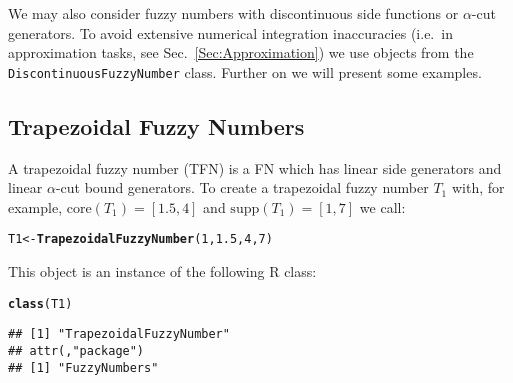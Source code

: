 \documentclass[11pt]{article}\usepackage{graphicx, color}
\makeatletter
\newcommand{\hlfunctioncall}[1]{\textcolor[rgb]{0.501960784313725,0,0.329411764705882}{\textbf{#1}}}%
\newenvironment{kframe}{%
 \def\at@end@of@kframe{}%
 \ifinner\ifhmode%
  \def\at@end@of@kframe{\end{minipage}}%
  \begin{minipage}{\columnwidth}%
 \fi\fi%
 \def\FrameCommand##1{\hskip\@totalleftmargin \hskip-\fboxsep
 \colorbox{shadecolor}{##1}\hskip-\fboxsep
     \hskip-\linewidth \hskip-\@totalleftmargin \hskip\columnwidth}%
 \MakeFramed {\advance\hsize-\width
   \@totalleftmargin\z@ \linewidth\hsize
   \@setminipage}}%
 {\par\unskip\endMakeFramed%
 \at@end@of@kframe}
\newenvironment{knitrout}{}{} %
\newcommand{\lang}[1]{\textsf{#1}\xspace}
\newcommand{\R}{\lang{R}}
\makeatother
\begin{document}
We may also consider fuzzy numbers with discontinuous side
functions or $\alpha$-cut generators.
To avoid extensive numerical integration inaccuracies 
(i.e.~in approximation tasks, see Sec.~\ref{Sec:Approximation})
we use objects from the \texttt{DiscontinuousFuzzyNumber} class.
Further on we will present some examples.


% 
% 
% 
% 
% 
% 


\subsection{Trapezoidal Fuzzy Numbers}\label{Sec:TFNdef}

A trapezoidal fuzzy number (TFN) is a FN which has linear
side generators and linear $\alpha$-cut bound generators.
To create a trapezoidal fuzzy number $T_1$
with, for example, $\mathrm{core}(T_1)=[1.5,4]$
and $\mathrm{supp}(T_1)=[1,7]$ we call:

\begin{knitrout}\small
{}\color{fgcolor}\begin{kframe}
\begin{alltt}
T1 <- \hlfunctioncall{TrapezoidalFuzzyNumber}(1,1.5,4,7)
\end{alltt}
\end{kframe}
\end{knitrout}


\noindent
This object is an instance of the following \R class:

\begin{knitrout}\small
{}\color{fgcolor}\begin{kframe}
\begin{alltt}
\hlfunctioncall{class}(T1)
\end{alltt}
\begin{verbatim}
## [1] "TrapezoidalFuzzyNumber"
## attr(,"package")
## [1] "FuzzyNumbers"
\end{verbatim}
\end{kframe}
\end{knitrout}
\end{document}
